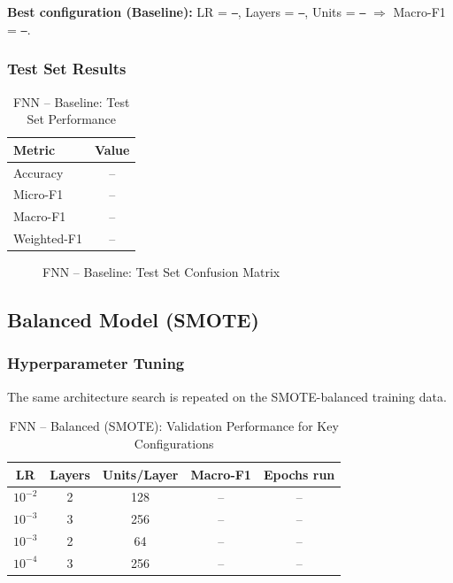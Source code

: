 \documentclass[12pt,a4paper]{article}
\begin{document}
\noindent\textbf{Best configuration (Baseline):} LR = \texttt{--}, Layers = \texttt{--}, Units = \texttt{--} $\Rightarrow$ Macro-F1 = \texttt{--}.

\subsubsection{Test Set Results}

\begin{table}[H]
    \centering
    \caption{FNN -- Baseline: Test Set Performance}
    \label{tab:fnn_baseline_test}
    \begin{tabular}{lc}
        \toprule
        \textbf{Metric} & \textbf{Value} \\
        \midrule
        Accuracy    & -- \\
        Micro-F1    & -- \\
        Macro-F1    & -- \\
        Weighted-F1 & -- \\
        \bottomrule
    \end{tabular}
\end{table}

\begin{figure}[H]
    \centering
    \caption{FNN -- Baseline: Test Set Confusion Matrix}
    \label{fig:fnn_baseline_cm}
\end{figure}

\subsection{Balanced Model (SMOTE)}

\subsubsection{Hyperparameter Tuning}

The same architecture search is repeated on the SMOTE-balanced training data.

\begin{table}[H]
    \centering
    \caption{FNN -- Balanced (SMOTE): Validation Performance for Key Configurations}
    \label{tab:fnn_balanced_tuning}
    \begin{tabular}{ccccc}
        \toprule
        LR & Layers & Units/Layer & Macro-F1 & Epochs run \\
        \midrule
        $10^{-2}$ & 2 & 128 & -- & -- \\
        $10^{-3}$ & 3 & 256 & -- & -- \\
        $10^{-3}$ & 2 & 64  & -- & -- \\
        $10^{-4}$ & 3 & 256 & -- & -- \\
        \bottomrule
    \end{tabular}
\end{table}
\end{document}
